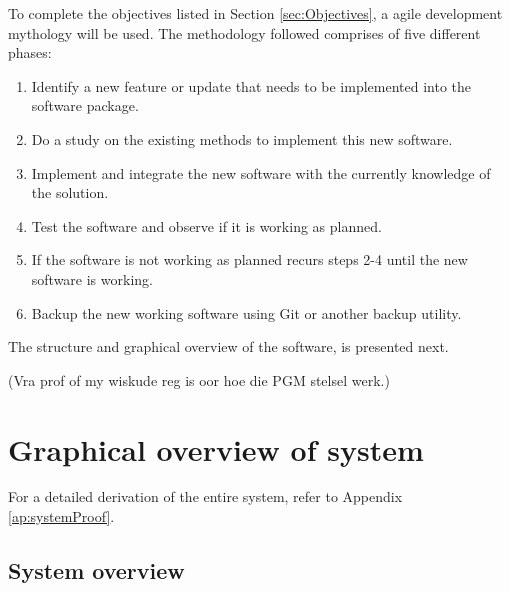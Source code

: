 To complete the objectives listed in Section \ref{sec:Objectives}, a agile development mythology will be used. The methodology followed comprises of five different phases:
\begin{enumerate}
\item Identify a new feature or update that needs to be implemented into the software package.
\item Do a study on the existing methods to implement this new software.
\item Implement and integrate the new software with the currently knowledge of the solution.
\item Test the software and observe if it is working as planned.
\item If the software is not working as planned recurs steps 2-4 until the new software is working.
\item Backup the new working software using Git or another backup utility.
\end{enumerate}

The structure and graphical overview of the software, is presented next.

(Vra prof of my wiskude reg is oor hoe die PGM stelsel werk.)

\section{Graphical overview of system}

For a detailed derivation of the entire system, refer to Appendix \ref{ap:systemProof}.

\subsection{System overview}

